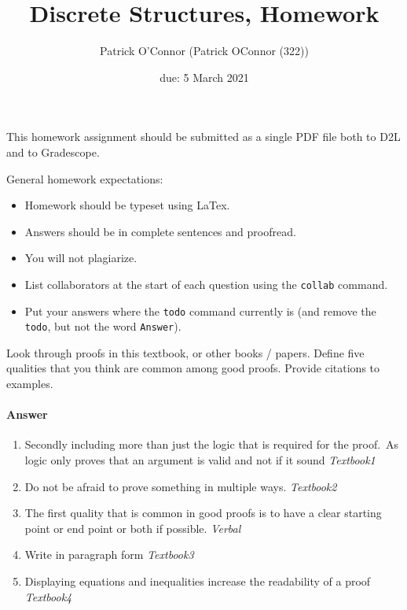 \documentclass{article}
\title{Discrete Structures, Homework \hwnum}
\author{{Patrick O'Connor} (Patrick OConnor (322))}
\date{due: 5 March 2021}
\begin{document}
\maketitle

This homework assignment should be
submitted as a single PDF file both to D2L and to Gradescope.

General homework expectations:
\begin{itemize}
    \item Homework should be typeset using LaTex.
    \item Answers should be in complete sentences and proofread.
    \item You will not plagiarize.
    \item List collaborators at the start of each question using the \texttt{collab} command.
    \item Put your answers where the \texttt{todo} command currently is (and
        remove the \texttt{todo}, but not the word \texttt{Answer}).
\end{itemize}


 

Look through proofs in this textbook, or other books / papers.  Define five
qualities that you think are common among good proofs. Provide citations to
examples.


\paragraph{Answer}
\begin{enumerate}


  \item Secondly including more than just the logic that is required for the proof.\
      As logic only proves that an argument is valid and not if it sound
        \emph{Textbook1}~\cite{etextbook1}

  \item Do not be afraid to prove something in multiple ways.
    \emph{Textbook2}~\cite{etextbook2}

  \item The first quality that is common in good proofs is to have a clear starting point
    or end point or both if possible.
    \emph{Verbal}~\cite{fasylecture}

  \item Write in paragraph form
  \emph{Textbook3}~\cite{etextbook3}

  \item Displaying equations and inequalities increase the readability of a proof
    \emph{Textbook4}~\cite{etextbook4}
\end{enumerate}
\end{document}
